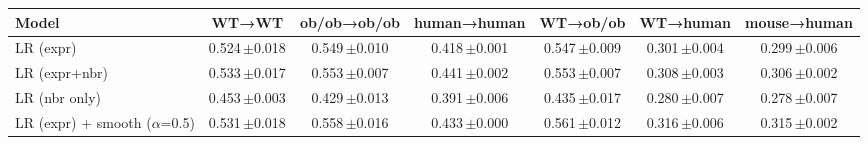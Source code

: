\begin{tabular}{lcccccc}
\toprule
Model & WT→WT & ob/ob→ob/ob & human→human & WT→ob/ob & WT→human & mouse→human \\
\midrule
LR (expr) & 0.524\,{\scriptsize$\pm$0.018} & 0.549\,{\scriptsize$\pm$0.010} & 0.418\,{\scriptsize$\pm$0.001} & 0.547\,{\scriptsize$\pm$0.009} & 0.301\,{\scriptsize$\pm$0.004} & 0.299\,{\scriptsize$\pm$0.006} \\
LR (expr+nbr) & 0.533\,{\scriptsize$\pm$0.017} & 0.553\,{\scriptsize$\pm$0.007} & 0.441\,{\scriptsize$\pm$0.002} & 0.553\,{\scriptsize$\pm$0.007} & 0.308\,{\scriptsize$\pm$0.003} & 0.306\,{\scriptsize$\pm$0.002} \\
LR (nbr only) & 0.453\,{\scriptsize$\pm$0.003} & 0.429\,{\scriptsize$\pm$0.013} & 0.391\,{\scriptsize$\pm$0.006} & 0.435\,{\scriptsize$\pm$0.017} & 0.280\,{\scriptsize$\pm$0.007} & 0.278\,{\scriptsize$\pm$0.007} \\
LR (expr) + smooth ($\alpha$=0.5) & 0.531\,{\scriptsize$\pm$0.018} & 0.558\,{\scriptsize$\pm$0.016} & 0.433\,{\scriptsize$\pm$0.000} & 0.561\,{\scriptsize$\pm$0.012} & 0.316\,{\scriptsize$\pm$0.006} & 0.315\,{\scriptsize$\pm$0.002} \\
\bottomrule
\end{tabular}

